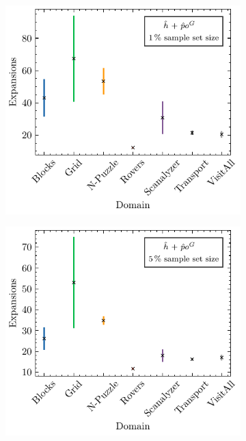 \documentclass[ppgc,diss,english]{iiufrgs}
\begin{document}
\begin{figure}[tb]
  \caption[Standard deviation of expansions using \hnn with \pog]{Mean number of expansions and its standard deviation per domain for GBFS guided by \hnn with \pog trained using sample sets of different sizes.}
  \centering
  \vspace{\baselineskip}
  \begin{subfigure}{0.41\textwidth}
    \centering
    \includegraphics[width=\linewidth]{img/error_hNN_poG_1pct.pdf}
  \end{subfigure}
  \begin{subfigure}{0.41\textwidth}
    \centering
    \includegraphics[width=\linewidth]{img/error_hNN_poG_5pct.pdf}
  \end{subfigure}



\end{figure}
\end{document}
